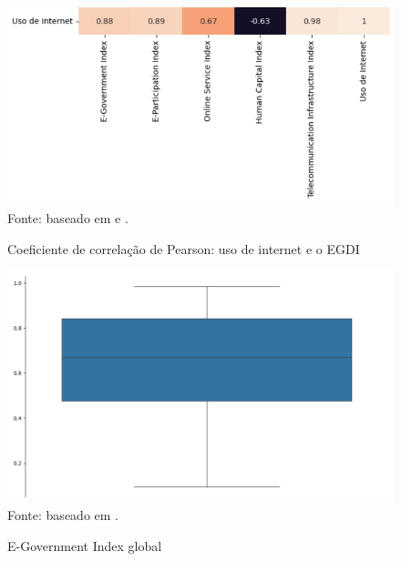 \begin{figure}[H]
    \centering
    \caption{Coeficiente de correlação de Pearson: uso de internet e o EGDI}
    \includegraphics[width=1\linewidth]{figuras/egdi/correlacao7.png}
    \label{fig:correlacao7}
    \footnotesize{Fonte: baseado em \cite{ONU_edgi_mapa} e \cite{ITU_uso_internet_mundo}.}
\end{figure}


\begin{figure}[H]
    \centering
    \caption{E-Government Index global}
    \includegraphics[width=1\linewidth]{figuras/egdi/boxplot_egov_global.png}
    \label{fig:boxplot_egov_global}
    \footnotesize{Fonte: baseado em \cite{ONU_edgi_mapa}.}
\end{figure}

